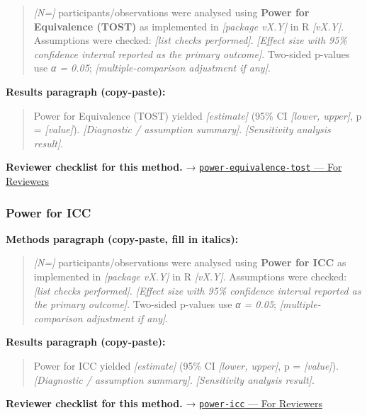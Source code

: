 \documentclass[
]{article}
\begin{document}
\begin{quote}
\emph{{[}N={]}} participants/observations were analysed using
\textbf{Power for Equivalence (TOST)} as implemented in \emph{{[}package
vX.Y{]}} in R \emph{{[}vX.Y{]}}. Assumptions were checked: \emph{{[}list
checks performed{]}}. \emph{{[}Effect size with 95\% confidence interval
reported as the primary outcome{]}}. Two-sided p-values use \emph{α =
0.05}; \emph{{[}multiple-comparison adjustment if any{]}}.
\end{quote}

\textbf{Results paragraph (copy-paste):}

\begin{quote}
Power for Equivalence (TOST) yielded \emph{{[}estimate{]}} (95\% CI
\emph{{[}lower, upper{]}}, p = \emph{{[}value{]}}). \emph{{[}Diagnostic
/ assumption summary{]}}. \emph{{[}Sensitivity analysis result{]}}.
\end{quote}

\textbf{Reviewer checklist for this method.} →
\href{../chapters/05-power/power-equivalence-tost.Rmd\#for-reviewers}{\texttt{power-equivalence-tost}
--- For Reviewers}

\subsubsection{Power for ICC}\label{power-for-icc}

\textbf{Methods paragraph (copy-paste, fill in italics):}

\begin{quote}
\emph{{[}N={]}} participants/observations were analysed using
\textbf{Power for ICC} as implemented in \emph{{[}package vX.Y{]}} in R
\emph{{[}vX.Y{]}}. Assumptions were checked: \emph{{[}list checks
performed{]}}. \emph{{[}Effect size with 95\% confidence interval
reported as the primary outcome{]}}. Two-sided p-values use \emph{α =
0.05}; \emph{{[}multiple-comparison adjustment if any{]}}.
\end{quote}

\textbf{Results paragraph (copy-paste):}

\begin{quote}
Power for ICC yielded \emph{{[}estimate{]}} (95\% CI \emph{{[}lower,
upper{]}}, p = \emph{{[}value{]}}). \emph{{[}Diagnostic / assumption
summary{]}}. \emph{{[}Sensitivity analysis result{]}}.
\end{quote}

\textbf{Reviewer checklist for this method.} →
\href{../chapters/05-power/power-icc.Rmd\#for-reviewers}{\texttt{power-icc}
--- For Reviewers}
\end{document}

